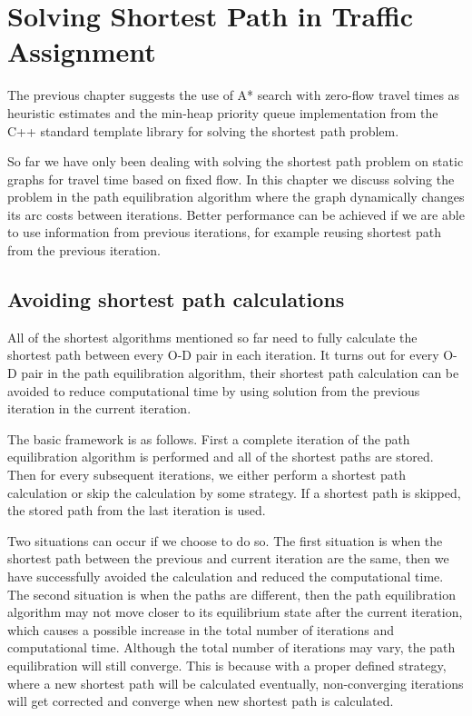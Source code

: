 \chapter{Solving Shortest Path in Traffic Assignment} \label{chap:iterative}
The previous chapter suggests the use of A* search with zero-flow travel times as heuristic estimates and the min-heap priority queue implementation from the C++ standard template library for solving the shortest path problem.

So far we have only been dealing with solving the shortest path problem on static graphs for travel time based on fixed flow.
In this chapter we discuss solving the problem in the path equilibration algorithm where
the graph dynamically changes its arc costs between iterations.
Better performance can be achieved if we are able to use information from previous iterations, for example reusing shortest path from the previous iteration.

\section{Avoiding shortest path calculations} \label{section:avoid}
All of the shortest algorithms mentioned so far need to fully calculate the shortest path between every O-D pair in each iteration.
It turns out for every O-D pair in the path equilibration algorithm,
their shortest path calculation can be avoided to reduce computational time by using solution from the previous iteration in the current iteration.

The basic framework is as follows.
First a complete iteration of the path equilibration algorithm is performed and all of the shortest paths are stored.
Then for every subsequent iterations,
we either perform a shortest path calculation or skip the calculation by some strategy.
If a shortest path is skipped, the stored path from the last iteration is used.

Two situations can occur if we choose to do so.
The first situation is when the shortest path between the previous and current iteration are the same,
then we have successfully avoided the calculation and reduced the computational time.
The second situation is when the paths are different,
then the path equilibration algorithm may not move closer to its equilibrium state after the current iteration,
which causes a possible increase in the total number of iterations and computational time.
Although the total number of iterations may vary,
the path equilibration will still converge.
This is because with a proper defined strategy,
where a new shortest path will be calculated eventually, non-converging iterations will get corrected and converge when new shortest path is calculated.


